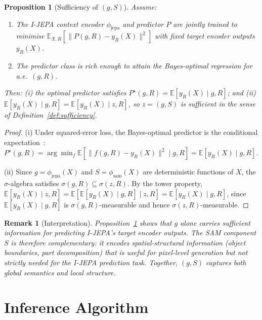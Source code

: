\documentclass[12pt]{article}
\newtheorem{proposition}[theorem]{Proposition}
\newtheorem{remark}[theorem]{Remark}
\begin{document}
\begin{proposition}[Sufficiency of $(g, S)$]
\label{prop:sufficiency}
Assume:
\begin{enumerate}
    \item[\textup{(A1)}] The I-JEPA context encoder $\phi_{\mathrm{jepa}}$
    and predictor $P$ are jointly trained to minimise
    $\mathbb{E}_{X, R}[\lVert P(g, R) - y_R(X) \rVert^2]$
    with fixed target encoder outputs $y_R(X)$.
    \item[\textup{(A2)}] The predictor class is rich enough to attain the
    Bayes-optimal regression for a.e.\ $(g, R)$.
\end{enumerate}
Then: (i) the optimal predictor satisfies
$P^\star(g, R) = \mathbb{E}[y_R(X) \mid g, R]$; and
(ii) $\mathbb{E}[y_R(X) \mid g, R] = \mathbb{E}[y_R(X) \mid z, R]$,
so $z = (g, S)$ is sufficient in the sense of
Definition~\ref{def:sufficiency}.
\end{proposition}

\begin{proof}
(i) Under squared-error loss, the Bayes-optimal predictor is the
conditional expectation~\cite{lehmann2006theory}:
$P^\star(g, R) = \arg\min_{f} \mathbb{E}[\lVert f(g, R) - y_R(X) \rVert^2 \mid g, R]
= \mathbb{E}[y_R(X) \mid g, R]$.

(ii) Since $g = \phi_{\mathrm{jepa}}(X)$ and $S = \phi_{\mathrm{sam}}(X)$
are deterministic functions of $X$, the $\sigma$-algebra satisfies
$\sigma(g, R) \subseteq \sigma(z, R)$.
By the tower property,
$\mathbb{E}[y_R(X) \mid z, R]
= \mathbb{E}[\mathbb{E}[y_R(X) \mid g, R] \mid z, R]
= \mathbb{E}[y_R(X) \mid g, R]$,
since $\mathbb{E}[y_R(X) \mid g, R]$ is $\sigma(g, R)$-measurable
and hence $\sigma(z, R)$-measurable.
\end{proof}

\begin{remark}[Interpretation]
Proposition~\ref{prop:sufficiency} shows that $g$ alone carries
sufficient information for predicting I-JEPA's target encoder outputs.
The SAM component $S$ is therefore \emph{complementary}: it encodes
spatial-structural information (object boundaries, part decomposition)
that is useful for pixel-level generation but not strictly needed for
the I-JEPA prediction task.
Together, $(g, S)$ captures both global semantics and local structure.
\end{remark}

\section{Inference Algorithm}
\label{sec:inference}
\end{document}
